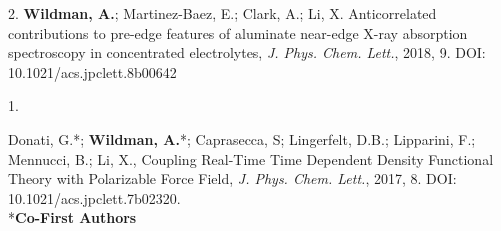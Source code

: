 


\begin{cvpublications}


\cvpublication
{2.} 
{\textbf{Wildman, A.}; Martinez-Baez, E.; Clark, A.; Li, X. Anticorrelated
contributions to pre-edge features of aluminate near-edge X-ray absorption
spectroscopy in concentrated electrolytes, \textit{J. Phys. Chem. Lett.},
2018, 9. DOI: 10.1021/acs.jpclett.8b00642} 


\cvpublication
{1.}
{\parbox[t]{0.95\textwidth}{\strut Donati, G.*; \textbf{Wildman, A.}*; Caprasecca, S; Lingerfelt, D.B.; Lipparini,
F.; Mennucci, B.; Li, X., Coupling Real-Time Time Dependent Density Functional
Theory with Polarizable Force Field, \textit{J. Phys. Chem. Lett.}, 2017, 8.
DOI: 10.1021/acs.jpclett.7b02320. \\ \**\textbf{Co-First Authors}}}



\end{cvpublications}
\vspace{-1cm}

